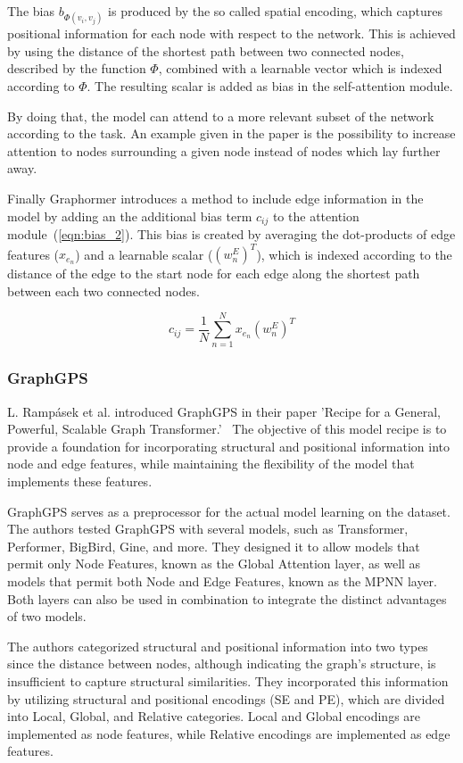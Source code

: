 The bias $b_{\Phi (v_i, v_j)}$ is produced by the so called spatial encoding, which captures positional information for each node with respect to the network. This is achieved by using the distance of the shortest path between two connected nodes, described by the function $\Phi$, combined with a learnable vector which is indexed according to $\Phi$. The resulting scalar is added as bias in the self-attention module.

By doing that, the model can attend to a more relevant subset of the network according to the task. An example given in the paper is the possibility to increase attention to nodes surrounding a given node instead of nodes which lay further away.

Finally Graphormer introduces a method to include edge information in the model by adding an the additional bias term $c_{ij}$ to the attention module~(\autoref{eqn:bias_2}). This bias is created by averaging the dot-products of edge features ($x_{e_n}$) and a learnable scalar ($(w_n^E)^T$), which is indexed according to the distance of the edge to the start node for each edge along the shortest path between each two connected nodes.

\begin{equation}
    c_{ij} = \frac{1}{N} \sum_{n=1}^{N} x_{e_n}(w_n^E)^T
    \label{eqn:bias_2}
\end{equation}

\subsubsection{GraphGPS}
\label{sec:graphgps}
L. Rampásek et al. introduced GraphGPS in their paper 'Recipe for a General, Powerful, Scalable Graph Transformer.'~\cite{2023graphgps} The objective of this model recipe is to provide a foundation for incorporating structural and positional information into node and edge features, while maintaining the flexibility of the model that implements these features.

GraphGPS serves as a preprocessor for the actual model learning on the dataset. The authors tested GraphGPS with several models, such as Transformer, Performer, BigBird, Gine, and more. They designed it to allow models that permit only Node Features, known as the Global Attention layer, as well as models that permit both Node and Edge Features, known as the MPNN layer. Both layers can also be used in combination to integrate the distinct advantages of two models.

The authors categorized structural and positional information into two types since the distance between nodes, although indicating the graph's structure, is insufficient to capture structural similarities. They incorporated this information by utilizing structural and positional encodings (SE and PE), which are divided into Local, Global, and Relative categories. Local and Global encodings are implemented as node features, while Relative encodings are implemented as edge features.

